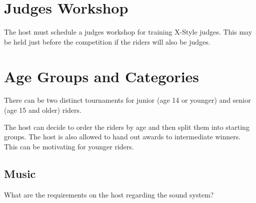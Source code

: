\section{Judges Workshop}

The host must schedule a judges workshop for training X-Style judges.
This may be held just before the competition if the riders will also be judges.

\section{Age Groups and Categories}

There can be two distinct tournaments for junior (age 14 or younger) and senior (age 15 and older) riders.

The host can decide to order the riders by age and then split them into starting groups.
The host is also allowed to hand out awards to intermediate winners.
This can be motivating for younger riders.

\begin{comment2016}
\section{Music}

What are the requirements on the host regarding the sound system?
\end{comment2016}
